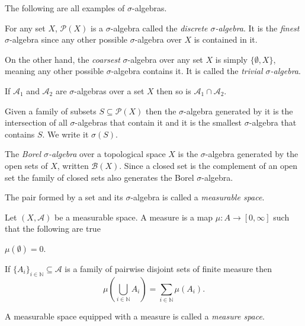 \documentclass[12pt,oneside]{book}
\numberwithin{table}{section}
\numberwithin{equation}{section}
\numberwithin{figure}{section}
\newcommand{\N}{\mathbb{N}}
\newcommand{\A}{\mathcal{A}}
\newcommand{\B}{\mathcal{B}}
\renewcommand{\P}{\mathcal{P}}
\begin{document}
\begin{example}
	The following are all examples of \( \sigma \)-algebras.
	\begin{points}
	\item For any set \( X \), \( \P(X) \) is a \( \sigma \)-algebra called the \emph{discrete \( \sigma \)-algebra}. It is the \emph{finest} \( \sigma \)-algebra since any other possible \( \sigma \)-algebra over \( X \) is contained in it.
	\item On the other hand, the \emph{coarsest} \( \sigma \)-algebra over any set \( X \) is simply \( \{ \emptyset, X \} \), meaning any other possible \( \sigma \)-algebra contains it. It is called the \emph{trivial \( \sigma \)-algebra}.
	\item If \( \A_1 \) and \( \A_2 \) are \( \sigma \)-algebras over a set \( X \) then so is \( \A_1 \cap \A_2 \).
	\item Given a family of subsets \( S \subseteq \P(X) \) then the \( \sigma \)-algebra generated by it is the intersection of all \( \sigma \)-algebras that contain it and it is the smallest \( \sigma \)-algebra that contains \( S \). We write it \( \sigma(S) \).
	\item The \emph{Borel \( \sigma \)-algebra} over a topological space \( X \) is the \( \sigma \)-algebra generated by the open sets of \( X \), written \( \B(X) \). Since a closed set is the complement of an open set the family of closed sets also generates the Borel \( \sigma \)-algebra.
	\end{points}
\end{example}
The pair formed by a set and its \( \sigma \)-algebra is called a \emph{measurable space}.

\begin{definition}[Measure]
	Let \( (X,\A) \) be a measurable space. A measure is a map \( \mu \colon A \to [0,\infty] \) such that the following are true
	\begin{points}
	\item \( \mu(\emptyset) = 0 \).
	\item If \( \{ A_i \}_{i \in \N} \subseteq \A \) is a family of pairwise disjoint sets of finite measure then
		\begin{equation*}
			\mu\left(\bigcup_{i \in \N} A_i\right) = \sum_{i \in \N} \mu(A_i). 
		\end{equation*}
	\end{points}
\end{definition}
A measurable space equipped with a measure is called a \emph{measure space}.
\end{document}
